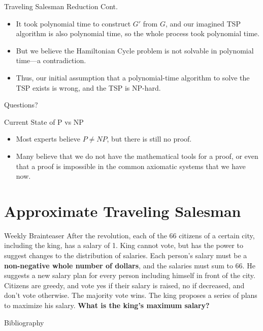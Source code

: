 \documentclass[aspectratio=169, handout]{beamer}
\begin{document}
\begin{frame}{Traveling Salesman Reduction Cont.}
    \begin{itemize}
        \item It took polynomial time to construct $G'$ from $G$, and our imagined TSP algorithm is also polynomial time, so the whole process took polynomial time. \pause
        \item But we believe the Hamiltonian Cycle problem is not solvable in polynomial time—a contradiction. \pause
        \item Thus, our initial assumption that a polynomial-time algorithm to solve the TSP exists is wrong, and the TSP is NP-hard.
    \end{itemize}
\end{frame}

\begin{frame}{}
      \begin{center}
    {\color{sigma@mainblue} \LARGE Questions?}
  \end{center}
\end{frame}

\begin{frame}{Current State of P vs NP}
    \begin{itemize}
        \item Most experts believe $P \ne NP$, but there is still no proof. \pause
        \item Many believe that we do not have the mathematical tools for a proof, or even that a proof is impossible in the common axiomatic systems that we have now. \cite{aaronson}
    \end{itemize}
\end{frame}


\section{Approximate Traveling Salesman}
\frame{\sectionpage}


\begin{frame}{Weekly Brainteaser}
    After the revolution, each of the 66 citizens of a certain city, including the king, has a salary of 1. King cannot vote, but has the power to suggest changes to the distribution of salaries. Each person's salary must be a \textbf{non-negative whole number of dollars}, and the salaries must sum to 66. He suggests a new salary plan for every person including himself in front of the city. Citizens are greedy, and vote yes if their salary is raised, no if decreased, and don't vote otherwise. The majority vote wins. The king proposes a series of plans to maximize his salary. \textbf{What is the king's maximum salary?}
\end{frame}



\begin{frame}[allowframebreaks]{Bibliography}
    \tiny
    
    
\end{frame}
\end{document}
